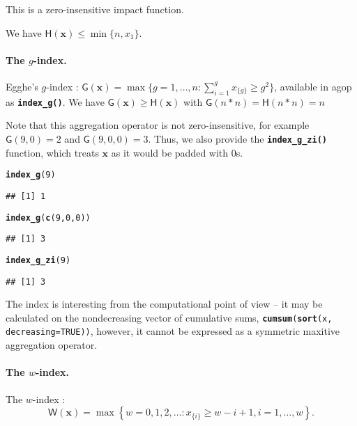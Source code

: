 \documentclass[11pt]{article}\usepackage{graphicx, color}
\makeatletter
\newcommand{\hlfunctioncall}[1]{\textcolor[rgb]{0.501960784313725,0,0.329411764705882}{\textbf{#1}}}%
\newcommand{\hlargument}[1]{\textcolor[rgb]{0.690196078431373,0.250980392156863,0.0196078431372549}{#1}}%
\newenvironment{kframe}{%
 \def\at@end@of@kframe{}%
 \ifinner\ifhmode%
  \def\at@end@of@kframe{\end{minipage}}%
  \begin{minipage}{\columnwidth}%
 \fi\fi%
 \def\FrameCommand##1{\hskip\@totalleftmargin \hskip-\fboxsep
 \colorbox{shadecolor}{##1}\hskip-\fboxsep
     \hskip-\linewidth \hskip-\@totalleftmargin \hskip\columnwidth}%
 \MakeFramed {\advance\hsize-\width
   \@totalleftmargin\z@ \linewidth\hsize
   \@setminipage}}%
 {\par\unskip\endMakeFramed%
 \at@end@of@kframe}
\newenvironment{knitrout}{}{} %
\newcommand{\package}[1]{\textsf{#1}\xspace}
\newcommand{\Rfunc}[1]{\texttt{\hlfunctioncall{#1}}}
\newcommand{\argument}[1]{\texttt{\hlargument{#1}}}
\newcommand{\vect}[1]{{\mathbf{#1}}}
\newcommand{\func}[1]{{\mathsf{#1}}}
\theoremstyle{remark}
\theoremstyle{definition}
\makeatother
\begin{document}
This is a zero-insensitive impact function.

We have $\func{H}(\vect{x})\le \min\{n, x_{1}\}$.

\paragraph{The $g$-index.}
Egghe's $g$-index \cite{Egghe2006:g}:
$\func{G}(\vect{x})=\max\{g=1,\dots,n: \sum_{i=1}^g x_{\{g\}}\ge g^2\}$,
available in \package{agop} as \Rfunc{index\_g()}.
We have $\func{G}(\vect{x})\ge \func{H}(\vect{x})$
with $\func{G}(n\ast n)=\func{H}(n\ast n)=n$


Note that this aggregation operator is not zero-insensitive,
for example $\func{G}(9,0)=2$ and $\func{G}(9,0,0)=3$.
Thus, we also provide the \Rfunc{index\_g\_zi()} function,
which treats $\vect{x}$ as it would be padded with $0$s.


\begin{knitrout}\small
{}\color{fgcolor}\begin{kframe}
\begin{alltt}
\hlfunctioncall{index_g}(9)
\end{alltt}
\begin{verbatim}
## [1] 1
\end{verbatim}
\begin{alltt}
\hlfunctioncall{index_g}(\hlfunctioncall{c}(9,0,0))
\end{alltt}
\begin{verbatim}
## [1] 3
\end{verbatim}
\begin{alltt}
\hlfunctioncall{index_g_zi}(9)
\end{alltt}
\begin{verbatim}
## [1] 3
\end{verbatim}
\end{kframe}
\end{knitrout}


The index is interesting from the computational point of view --
it may be calculated on the nondecreasing vector of cumulative sums,
\texttt{\Rfunc{cumsum}(\Rfunc{sort}(x, \argument{decreasing=}TRUE))},
however, it cannot be expressed as a symmetric maxitive aggregation operator.



\paragraph{The $w$-index.}
 The $w$-index \cite{Woeginger2008:axiomatich}:
\begin{equation}\label{Eq:IndexW}
\func{W}(\vect{x}) = \max\left\{w=0,1,2,\ldots: {x}_{\{i\}} \ge w-i+1, i=1,\dots,w\right\}.
\end{equation}
\end{document}

